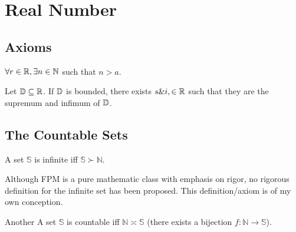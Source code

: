 \documentclass[../note.tex]{subfiles}
\begin{document}
\section{Real Number}
\subsection{Axioms}
\begin{axiom}
	$\forall r \in \mathbb{R}, \exists n \in \mathbb{N}$ such that $n>a$.
\end{axiom}
\begin{axiom} 
	Let $\mathbb{D}\subseteq \mathbb{R}$. If $\mathbb{D}$ is bounded, there exists $s\&i, \in \mathbb{R}$ such that they are the supremum and infimum of $\mathbb{D}$.
\end{axiom}

\subsection{The Countable Sets}

\begin{axiom}
	A set $\mathbb{S}$ is infinite iff $\mathbb{S} \succ \mathbb{N}$. 
\end{axiom}

\begin{remark}
	Although FPM is a pure mathematic class with emphasis on rigor, no rigorous definition for the infinite set has been proposed. This definition/axiom is of my own conception.
\end{remark}

\begin{definition}
	Another A set $\mathbb{S}$ is countable iff $\mathbb{N} \asymp \mathbb{S}$ (there exists a bijection $f:\mathbb{N} \rightarrow \mathbb{S}$).
\end{definition}

\end{document}
